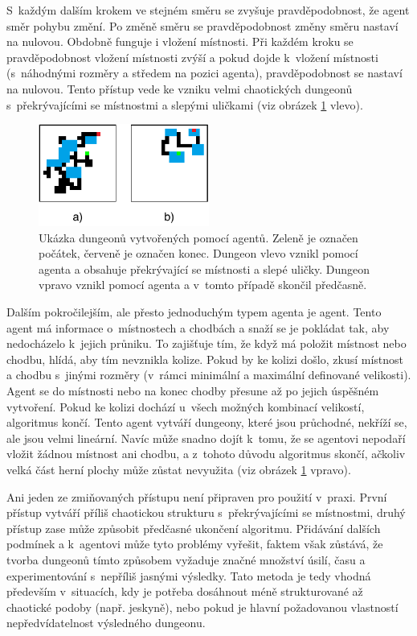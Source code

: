 S~každým dalším krokem ve stejném směru se zvyšuje pravděpodobnost, že agent směr pohybu změní.
Po změně směru se pravděpodobnost změny směru nastaví na nulovou.
Obdobně funguje i vložení místnosti.
Při každém kroku se pravděpodobnost vložení místnosti zvýší a pokud dojde k~vložení místnosti (s~náhodnými rozměry a středem na pozici agenta), pravděpodobnost se nastaví na nulovou.
Tento přístup vede ke vzniku velmi chaotických dungeonů s~překrývajícími se místnostmi a slepými uličkami (viz obrázek \ref{img:agent_dungeon} vlevo).
\begin{figure}[hbt]
    \centering
    \includegraphics[width=0.5\textwidth]{obrazky/agent_dungeon.pdf}
    \caption{Ukázka dungeonů vytvořených pomocí agentů. Zeleně je označen počátek, červeně je označen konec. Dungeon vlevo vznikl pomocí  agenta a obsahuje překrývající se místnosti a slepé uličky. Dungeon vpravo vznikl pomocí  agenta a v~tomto případě skončil předčasně.}
    \label{img:agent_dungeon}
\end{figure}
\par
Dalším pokročilejším, ale přesto jednoduchým typem agenta je  agent.
Tento agent má informace o~místnostech a chodbách a snaží se je pokládat tak, aby nedocházelo k~jejich průniku.
To zajišťuje tím, že když má položit místnost nebo chodbu, hlídá, aby tím nevznikla kolize.
Pokud by ke kolizi došlo, zkusí místnost a chodbu s~jinými rozměry (v~rámci minimální a maximální definované velikosti).
Agent se do místnosti nebo na konec chodby přesune až po jejich úspěšném vytvoření.
Pokud ke kolizi dochází u~všech možných kombinací velikostí, algoritmus končí.
Tento agent vytváří dungeony, které jsou průchodné, nekříží se, ale jsou velmi lineární.
Navíc může snadno dojít k~tomu, že se agentovi nepodaří vložit žádnou místnost ani chodbu, a z~tohoto důvodu algoritmus skončí, ačkoliv velká část herní plochy může zůstat nevyužita (viz obrázek \ref{img:agent_dungeon} vpravo).
\par
Ani jeden ze zmiňovaných přístupu není připraven pro použití v~praxi.
První přístup vytváří příliš chaotickou strukturu s~překrývajícími se místnostmi, druhý přístup zase může způsobit předčasné ukončení algoritmu.
Přidávání dalších podmínek a  k~agentovi může tyto problémy vyřešit, faktem však zůstává, že tvorba dungeonů tímto způsobem vyžaduje značné množství úsilí, času a experimentování s~nepříliš jasnými výsledky.
Tato metoda je tedy vhodná především v~situacích, kdy je potřeba dosáhnout méně strukturované až chaotické podoby (např. jeskyně), nebo pokud je hlavní požadovanou vlastností nepředvídatelnost výsledného dungeonu\cite{lit:pcg_constructive_methods}.

